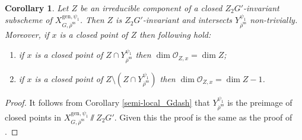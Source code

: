 \documentclass{amsart}
\newtheorem{cor}[prop]{Corollary}
\theoremstyle{definition}
\theoremstyle{remark}
\newcommand{\OO}{\mathcal O}
\newcommand{\rhobar}{\overline{\rho}}
\newcommand{\gen}{\mathrm{gen}}
\newcommand{\rhobarss}{\rhobar^{\mathrm{ss}}}
\begin{document}
\begin{cor}\label{bip_recyc} Let $Z$ be an irreducible component of a closed $Z_2G'$-invariant subscheme of $X^{\gen, \psi_1}_{G, \rhobarss}$.
Then $Z$ is $Z_2G'$-invariant and intersects $Y^{\psi_1}_{\rhobarss}$
non-trivially. Moreover, if $x$ is a closed point of $Z$ then following hold: 
\begin{enumerate}
\item if $x$ is a closed point of  $Z\cap Y^{\psi_1}_{\rhobarss}$ then $\dim \OO_{Z,x}= \dim Z$;
\item if $x$ is a closed point of $Z\setminus (Z\cap Y^{\psi_1}_{\rhobarss})$ then $\dim \OO_{Z, x}= \dim Z -1$.
\end{enumerate}
\end{cor}
\begin{proof} It follows from Corollary \ref{semi-local_Gdash} that  $Y^{\psi_1}_{\rhobarss}$ is 
the preimage of closed points in $X^{\gen, \psi_1}_{G, \rhobarss}\sslash Z_2G'$. Given this 
the proof is the same as the proof of \cite[Lemma 3.21]{BIP_new}.
\end{proof} 
\end{document}
